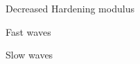 \begin{frame}{Decreased Hardening modulus}%
  \vspace{-0.25cm}
  \begin{block}{Fast waves}
    \vspace{-0.75cm}
    \centering
    
  \end{block}
  \vspace{-0.5cm}
  \begin{block}{Slow waves}
    \vspace{-0.5cm}
    \centering
    
  \end{block}
\end{frame}



